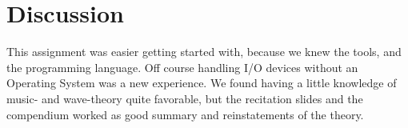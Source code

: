 \section{Discussion}
This assignment was easier getting started with, because we knew the tools,  and the programming language. Off course handling I/O devices without an Operating System was a new experience. We found having a little knowledge of music- and wave-theory quite favorable, but the recitation slides and the compendium worked as good summary and reinstatements of the theory.